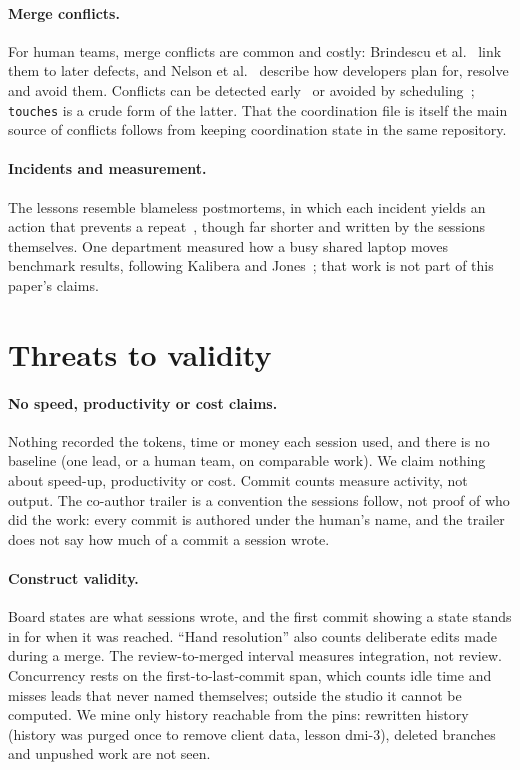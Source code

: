 \documentclass[11pt]{article}
\newcommand{\code}[1]{\texttt{#1}}
\begin{document}
\paragraph{Merge conflicts.}
For human teams, merge conflicts are common and costly: Brindescu et
al.~\citep{brindescu2020merge} link them to later defects, and Nelson et
al.~\citep{nelson2019lifecycle} describe how developers plan for, resolve and avoid them.
Conflicts can be detected early~\citep{brun2011crystal} or avoided by
scheduling~\citep{kasi2013cassandra}; \code{touches} is a crude form of the latter. That
the coordination file is itself the main source of conflicts follows from keeping
coordination state in the same repository.

\paragraph{Incidents and measurement.}
The lessons resemble blameless postmortems, in which each incident yields an action that
prevents a repeat~\citep{lunney2016postmortem}, though far shorter and written by the
sessions themselves. One department measured how a busy shared laptop moves benchmark
results, following Kalibera and Jones~\citep{kalibera2013benchmarking}; that work is not
part of this paper's claims.

\section{Threats to validity}\label{sec:threats}

\paragraph{No speed, productivity or cost claims.}
Nothing recorded the tokens, time or money each session used, and there is no baseline
(one lead, or a human team, on comparable work). We claim nothing about speed-up,
productivity or cost. Commit counts measure activity, not output. The co-author trailer
is a convention the sessions follow, not proof of who did the work: every commit is
authored under the human's name, and the trailer does not say how much of a commit a
session wrote.

\paragraph{Construct validity.}
Board states are what sessions wrote, and the first commit showing a state stands in for
when it was reached. ``Hand resolution'' also counts deliberate edits made during a merge.
The review-to-merged interval measures integration, not review. Concurrency rests on the
first-to-last-commit span, which counts idle time and misses leads that never named
themselves; outside the studio it cannot be computed. We mine only history reachable
from the pins: rewritten history (history was purged once to remove client data, lesson %
dmi-3), deleted branches and unpushed work are not seen.
\end{document}
